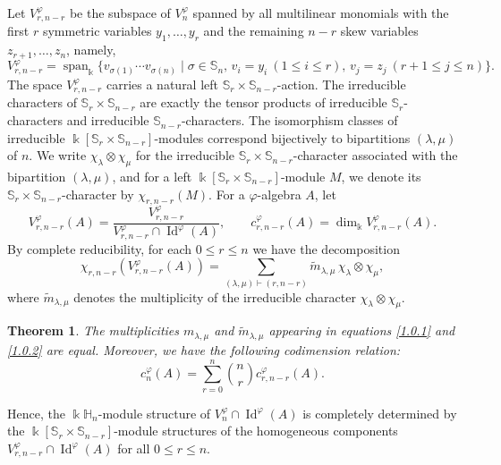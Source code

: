 \documentclass{amsart}
\newtheorem{thm}{Theorem}[section]
\theoremstyle{definition}
\theoremstyle{remark}
\numberwithin{equation}{section}
\def \la{\lambda}
\def \si{\sigma}
\def \vp{\varphi}
\def \k{\Bbbk}
\def \H{\mathbb{H}}
\def \S{\mathbb{S}}
\def \Id{\operatorname{Id}}
\def \sp{\operatorname{span}}
\begin{document}
	Let $V_{r,n-r}^\vp$ be the subspace of $V_n^\vp$ spanned by all multilinear monomials with the first $r$ symmetric variables $y_1, \dots, y_r$ and the remaining $n-r$ skew variables $z_{r+1}, \dots, z_n$, namely,
	\[
	V_{r,n-r}^\vp = \sp_\k \{ v_{\si(1)} \cdots v_{\si(n)} \mid \si \in \S_n, \, v_i = y_i \ (1 \leq i \leq r), \, v_j = z_j \ (r+1 \leq j \leq n) \}.
	\]
	The space $V_{r,n-r}^\vp$ carries a natural left $\S_r \times \S_{n-r}$-action. The irreducible characters of $\S_r \times \S_{n-r}$ are exactly the tensor products of irreducible $\S_r$-characters and irreducible $\S_{n-r}$-characters. The isomorphism classes of irreducible $\k[\S_r \times \S_{n-r}]$-modules correspond bijectively to bipartitions $(\lambda,\mu)$ of $n$. We write $\chi_\la \otimes \chi_\mu$ for the irreducible $\S_r \times \S_{n-r}$-character associated with the bipartition $(\la,\mu)$, and for a left $\k[ \S_r \times \S_{n-r}]$-module $M$, we denote its $\S_r \times \S_{n-r}$-character by $\chi_{r,n-r}(M)$. For a $\vp$-algebra $A$, let
	\[
	V_{r,n-r}^\vp(A) = \frac{V_{r,n-r}^\vp}{V_{r,n-r}^\vp \cap \Id^\vp(A)},
	\qquad
	c_{r,n-r}^\vp(A) = \dim_\k V_{r,n-r}^\vp(A).
	\]
	By complete reducibility, for each $0 \leq r \leq n$ we have the decomposition
	\begin{equation} \label{1.0.2} \tag{E1.0.2}
		\chi_{r,n-r}(V_{r,n-r}^\vp(A)) = \sum_{(\la,\mu) \vdash (r,n-r)} \tilde{m}_{\la,\mu} \, \chi_\la \otimes \chi_\mu,
	\end{equation}
	where $\tilde{m}_{\la,\mu}$ denotes the multiplicity of the irreducible character $\chi_\la \otimes \chi_\mu$.
	
	\begin{thm}\cite[Theorem 1.3]{DG}\label{thm1.1}
		The multiplicities $m_{\la,\mu}$ and $\tilde{m}_{\la,\mu}$ appearing in equations \eqref{1.0.1} and \eqref{1.0.2} are equal. Moreover, we have the following codimension relation:
		\[
		c_n^\vp(A) = \sum_{r=0}^{n} \binom{n}{r} c_{r,n-r}^\vp(A).
		\]
	\end{thm}
	Hence, the $\k\H_n$-module structure of $V_n^\vp \cap \Id^\vp(A)$ is completely determined by the $\k[\S_r \times \S_{n-r}]$-module structures of the homogeneous components $V_{r,n-r}^\vp \cap \Id^\vp(A)$ for all $0 \leq r \leq n$.
	
\end{document}
